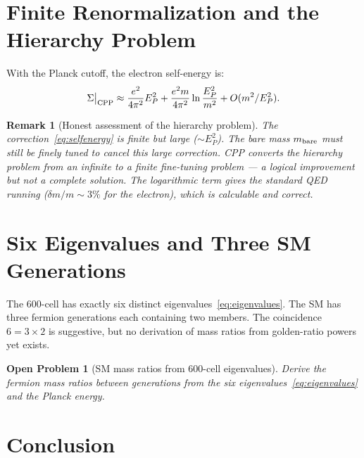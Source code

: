 \documentclass[11pt,letterpaper]{article}
\newtheorem{remark}[theorem]{Remark}
\newtheorem{openprob}[theorem]{Open Problem}
\newcommand{\EP}{E_P}
\begin{document}
\section{Finite Renormalization and the Hierarchy Problem}

With the Planck cutoff, the electron self-energy is:
\begin{equation}
\Sigma\big|_{\rm CPP}
\approx \frac{e^2}{4\pi^2}\EP^2
+ \frac{e^2 m}{4\pi^2}\ln\frac{\EP^2}{m^2}
+ O(m^2/\EP^2).
\label{eq:selfenergy}
\end{equation}

\begin{remark}[Honest assessment of the hierarchy problem]
The correction~\eqref{eq:selfenergy} is \emph{finite} but
\emph{large} ($\sim E_P^2$).  The bare mass $m_{\rm bare}$ must
still be finely tuned to cancel this large correction.  CPP converts
the hierarchy problem from an \emph{infinite} to a \emph{finite}
fine-tuning problem --- a logical improvement but not a complete
solution.  The logarithmic term gives the standard QED running
($\delta m/m \sim 3\%$ for the electron), which is calculable and
correct.
\end{remark}

\section{Six Eigenvalues and Three SM Generations}

The 600-cell has exactly six distinct eigenvalues~\eqref{eq:eigenvalues}.
The SM has three fermion generations each containing two members.
The coincidence $6 = 3\times2$ is suggestive, but no derivation of
mass ratios from golden-ratio powers yet exists.

\begin{openprob}[SM mass ratios from 600-cell eigenvalues]
\label{op:generations}
Derive the fermion mass ratios between generations from the six
eigenvalues~\eqref{eq:eigenvalues} and the Planck energy.
\end{openprob}

\section{Conclusion}
\end{document}
